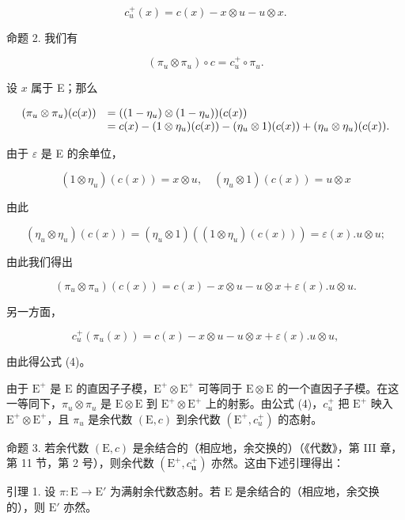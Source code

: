 \[
c _ {u} ^ {+} (x) = c (x) - x \otimes u - u \otimes x.\tag{3}
\]

命题 2. 我们有

\[
\left(\pi_ {u} \otimes \pi_ {u}\right) \circ c = c _ {u} ^ {+} \circ \pi_ {u}.\tag{4}
\]

设 \(x\) 属于 E；那么

\[
\begin{array}{r l} (\pi_ {u} \otimes \pi_ {u}) (c (x)) & = ((1 - \eta_ {u}) \otimes (1 - \eta_ {u})) (c (x)) \\ & = c (x) - (1 \otimes \eta_ {u}) (c (x)) - (\eta_ {u} \otimes 1) (c (x)) + (\eta_ {u} \otimes \eta_ {u}) (c (x)). \end{array}
\]

由于 \(\varepsilon\) 是 E 的余单位，

\[
(1 \otimes \eta_ {u}) (c (x)) = x \otimes u, \quad (\eta_ {u} \otimes 1) (c (x)) = u \otimes x
\]

由此

\[
\left(\eta_ {u} \otimes \eta_ {u}\right) (c (x)) = \left(\eta_ {u} \otimes 1\right) \left(\left(1 \otimes \eta_ {u}\right) (c (x))\right) = \varepsilon (x). u \otimes u;
\]

由此我们得出

\[
\left(\pi_ {u} \otimes \pi_ {u}\right) (c (x)) = c (x) - x \otimes u - u \otimes x + \varepsilon (x). u \otimes u.
\]

另一方面，

\[
c _ {u} ^ {+} \left(\pi_ {u} (x)\right) = c (x) - x \otimes u - u \otimes x + \varepsilon (x). u \otimes u,
\]

由此得公式 (4)。

由于 \(\mathrm{E}^{+}\) 是 \(\mathrm{E}\) 的直因子子模，\(\mathrm{E}^{+} \otimes \mathrm{E}^{+}\) 可等同于 \(\mathrm{E} \otimes \mathrm{E}\) 的一个直因子子模。在这一等同下，\(\pi_{u} \otimes \pi_{u}\) 是 \(\mathrm{E} \otimes \mathrm{E}\) 到 \(\mathrm{E}^{+} \otimes \mathrm{E}^{+}\) 上的射影。由公式 (4)，\(c_{u}^{+}\) 把 \(\mathrm{E}^{+}\) 映入 \(\mathrm{E}^{+} \otimes \mathrm{E}^{+}\)，且 \(\pi_{u}\) 是余代数 \((\mathrm{E}, c)\) 到余代数 \((\mathrm{E}^{+}, c_{u}^{+})\) 的态射。

命题 3. 若余代数 \((\mathrm{E}, c)\) 是余结合的（相应地，余交换的）（《代数》，第 III 章，第 11 节，第 2 号），则余代数 \((\mathrm{E}^{+}, c_{\mathbf{u}}^{+})\) 亦然。这由下述引理得出：

引理 1. 设 \(\pi: \mathrm{E} \to \mathrm{E}'\) 为满射余代数态射。若 \(\mathrm{E}\) 是余结合的（相应地，余交换的），则 \(\mathrm{E}'\) 亦然。

